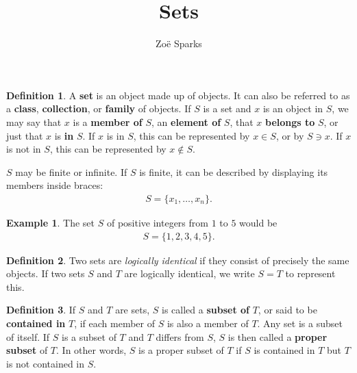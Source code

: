 \documentclass[12pt]{article}
\title{Sets}
\author{Zoë Sparks}
\begin{document}
\theoremstyle{definition}

\newtheorem{thm}{Theorem}
\newtheorem*{nthm}{Theorem}
\newtheorem{sthm}{}[thm]
\newtheorem{lemma}{Lemma}[thm]
\newtheorem*{nlemma}{Lemma}
\newtheorem{cor}{Corollary}[thm]
\newtheorem*{prop}{Property}
\newtheorem*{defn}{Definition}
\newtheorem*{comm}{Comment}
\newtheorem*{exm}{Example}

\maketitle

\begin{defn}
  A \textbf{set} is an object made up of objects. It can also be referred to as a
  \textbf{class}, \textbf{collection}, or \textbf{family} of objects. If $S$ is a set
  and $x$ is an object in $S$, we may say that $x$ is a \textbf{member of} $S$, an
  \textbf{element of} $S$, that $x$ \textbf{belongs to} $S$, or just that $x$ is
  \textbf{in} $S$. If $x$ is in $S$, this can be represented by $x \in S$, or by $S
  \ni x$. If $x$ is not in $S$, this can be represented by $x \notin S$.

  $S$ may be finite or infinite. If $S$ is finite, it can be described by displaying
  its members inside braces:
  \begin{align*}
    S = \{x_1,\ldots,x_n\}.
  \end{align*}
\end{defn}

\begin{exm}
  The set $S$ of positive integers from $1$ to $5$ would be
  \begin{align*}
    S = \{1,2,3,4,5\}.
  \end{align*}
\end{exm}

\begin{defn}
  Two sets are \textit{logically identical} if they consist of precisely the same
  objects. If two sets $S$ and $T$ are logically identical, we write $S = T$ to
  represent this.
\end{defn}

\begin{defn}
  If $S$ and $T$ are sets, $S$ is called a \textbf{subset of} $T$, or said to be
  \textbf{contained in} $T$, if each member of $S$ is also a member of $T$. Any set
  is a subset of itself. If $S$ is a subset of $T$ and $T$ differs from $S$, $S$ is
  then called a \textbf{proper subset} of $T$. In other words, $S$ is a proper subset
  of $T$ if $S$ is contained in $T$ but $T$ is not contained in $S$.
\end{defn}
\end{document}
